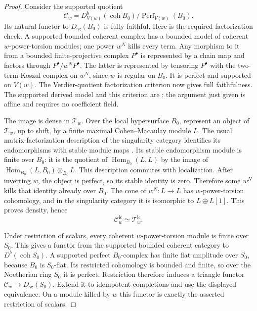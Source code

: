 \begin{proof}
Consider the supported quotient
\[
 \mathcal C_w=
 D^b_{V(w)}(\operatorname{coh}B_0)/
                  \operatorname{Perf}_{V(w)}(B_0).
\]
Its natural functor to \(D_{\mathrm{sg}}(B_0)\) is fully faithful.
Here is the required factorization check.  A supported bounded coherent
complex has a bounded model of coherent \(w\)-power-torsion modules;
one power \(w^N\) kills every term.  Any morphism to it from a bounded
finite-projective complex \(P^\bullet\) is represented by a chain map
and factors through \(P^\bullet/w^NP^\bullet\).  The latter is
represented by tensoring \(P^\bullet\) with the two-term Koszul
complex on \(w^N\), since \(w\) is regular on \(B_0\).  It is perfect
and supported on \(V(w)\).  The Verdier-quotient factorization
criterion now gives full faithfulness.  The supported derived model
and this criterion are \citet[Lemmas 2.1, 2.5, and 2.6,
preprint pp.~3--5]{Orlov2011};
the argument just given is affine and requires no coefficient field.

The image is dense in \(\mathcal T_w\).  Over the local hypersurface
\(B_0\), represent an object of \(\mathcal T_w\), up to shift, by a
finite maximal Cohen--Macaulay module \(L\).  The usual
matrix-factorization description of the singularity category
identifies its endomorphisms with stable module maps
\citep[equation (1.1), p.~2, and Appendix B, pp.~37--40]{BurkeWalker2012}.
Its stable endomorphism module is finite over \(B_0\): it is the
quotient of \(\operatorname{Hom}_{B_0}(L,L)\) by the image of
\(\operatorname{Hom}_{B_0}(L,B_0)\otimes_{B_0}L\).
This description commutes with localization.  After inverting \(w\),
the object is perfect, so its stable identity is zero.  Therefore
some \(w^N\) kills that identity already over \(B_0\).
The cone of \(w^N:L\to L\) has \(w\)-power-torsion cohomology,
and in the singularity category it is isomorphic to \(L\oplus L[1]\).
This proves density, hence
\[
 \mathcal C_w^{\mathrm{ic}}\simeq\mathcal T_w^{\mathrm{ic}}.
\]

Under restriction of scalars, every coherent \(w\)-power-torsion
module is finite over \(S_0\).  This gives a functor from the supported
bounded coherent category to \(D^b(\operatorname{coh}S_0)\).
A supported perfect \(B_0\)-complex has finite flat amplitude over
\(S_0\), because \(B_0\) is \(S_0\)-flat.  Its restricted cohomology
is bounded and finite, so over the Noetherian ring \(S_0\) it is
perfect.  Restriction therefore induces a triangle functor
\(\mathcal C_w\to D_{\mathrm{sg}}(S_0)\).
Extend it to idempotent completions and use the displayed equivalence.
On a module killed by \(w\) this functor is exactly the asserted
restriction of scalars.
\end{proof}

